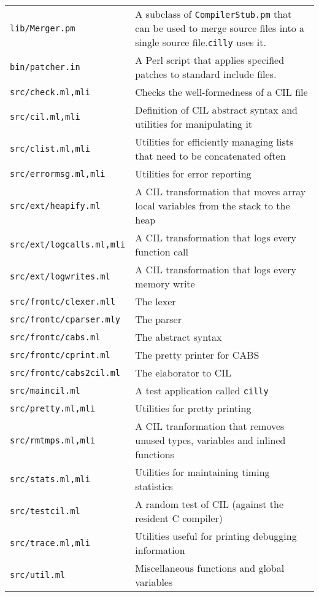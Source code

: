 \documentclass{article}
\def\t#1{{\tt #1}}
\begin{document}
\begin{tabular}{ll}
\t{lib/Merger.pm}               &  A subclass of \t{CompilerStub.pm} that can
                                  be used to merge source files into a single
                                  source file.\t{cilly}
                                  uses it. \\
\t{bin/patcher.in}              & A Perl script that applies specified patches
                                  to standard include files.\\
\t{src/check.ml,mli}            & Checks the well-formedness of a CIL file \\
\t{src/cil.ml,mli}              & Definition of CIL abstract syntax and
                                   utilities for manipulating it\\
\t{src/clist.ml,mli}            & Utilities for efficiently managing lists
                                   that need to be concatenated often\\
\t{src/errormsg.ml,mli}         & Utilities for error reporting \\
\t{src/ext/heapify.ml}          & A CIL transformation that moves array local
                                   variables from the stack to the heap \\
\t{src/ext/logcalls.ml,mli}     & A CIL transformation that logs every
                                   function call \\
\t{src/ext/logwrites.ml}        & A CIL transformation that logs every memory
                                   write \\
\t{src/frontc/clexer.mll}       & The lexer \\
\t{src/frontc/cparser.mly}      & The parser \\
\t{src/frontc/cabs.ml}          & The abstract syntax \\
\t{src/frontc/cprint.ml}        & The pretty printer for CABS \\
\t{src/frontc/cabs2cil.ml}      & The elaborator to CIL \\
\t{src/maincil.ml}                 & A test application called \t{cilly} \\
\t{src/pretty.ml,mli}           & Utilities for pretty printing \\
\t{src/rmtmps.ml,mli}           & A CIL tranformation that removes unused
                                  types, variables and inlined functions \\
\t{src/stats.ml,mli}            & Utilities for maintaining timing statistics
\\
\t{src/testcil.ml}              & A random test of CIL (against the resident 
                                  C compiler)\\
\t{src/trace.ml,mli}            & Utilities useful for printing debugging
                                   information\\
\t{src/util.ml}                 & Miscellaneous functions and global variables
\end{tabular}
\end{document}
